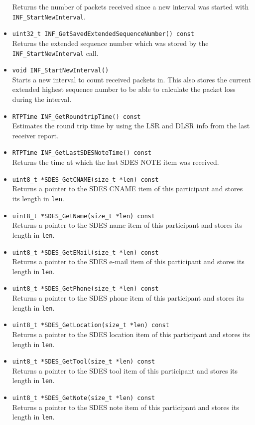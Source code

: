 \documentclass[12pt,a4paper]{article}
\begin{document}
\begin{itemize}
						Returns the number of packets received since a new interval was
						started with {\tt INF\_StartNewInterval}.
					\item {\tt uint32\_t INF\_GetSavedExtendedSequenceNumber() const}\\
						Returns the extended sequence number which was stored by the
						{\tt INF\_StartNewInterval} call.
					\item {\tt void INF\_StartNewInterval()}\\
						Starts a new interval to count received packets in. This also stores
						the current extended highest sequence number to be able to calculate
						the packet loss during the interval.
					\item {\tt RTPTime INF\_GetRoundtripTime() const}\\
						Estimates the round trip time by using the LSR and DLSR info from the
						last receiver report.
					\item {\tt RTPTime INF\_GetLastSDESNoteTime() const}\\
						Returns the time at which the last SDES NOTE item was received.
					\item {\tt uint8\_t *SDES\_GetCNAME(size\_t *len) const}\\
						Returns a pointer to the SDES CNAME item of this participant and stores
						its length in {\tt len}.
					\item {\tt uint8\_t *SDES\_GetName(size\_t *len) const}\\
						Returns a pointer to the SDES name item of this participant and stores
						its length in {\tt len}.
					\item {\tt uint8\_t *SDES\_GetEMail(size\_t *len) const}\\
						Returns a pointer to the SDES e-mail item of this participant and stores
						its length in {\tt len}.
					\item {\tt uint8\_t *SDES\_GetPhone(size\_t *len) const}\\
						Returns a pointer to the SDES phone item of this participant and stores
						its length in {\tt len}.
					\item {\tt uint8\_t *SDES\_GetLocation(size\_t *len) const}\\
						Returns a pointer to the SDES location item of this participant and stores
						its length in {\tt len}.
					\item {\tt uint8\_t *SDES\_GetTool(size\_t *len) const}\\
						Returns a pointer to the SDES tool item of this participant and stores
						its length in {\tt len}.
					\item {\tt uint8\_t *SDES\_GetNote(size\_t *len) const}\\
						Returns a pointer to the SDES note item of this participant and stores
						its length in {\tt len}.
				\end{itemize}
\end{document}
